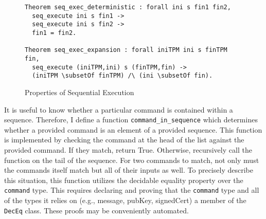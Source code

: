\begin{figure}[h]
\begin{lstlisting}[language=Coq]
Theorem seq_exec_deterministic : forall ini s fin1 fin2,
  seq_execute ini s fin1 ->
  seq_execute ini s fin2 ->
  fin1 = fin2.

Theorem seq_exec_expansion : forall iniTPM ini s finTPM fin,
  seq_execute (iniTPM,ini) s (finTPM,fin) ->
  (iniTPM \subsetOf finTPM) /\ (ini \subsetOf fin).
\end{lstlisting}
\caption{Properties of Sequential Execution}
\end{figure}

It is useful to know whether a particular command is contained within a sequence. Therefore, I define a function \verb|command_in_sequence| which determines whether a provided command is an element of a provided sequence. This function is implemented by checking the command at the head of the list against the provided command. If they match, return True. Otherwise, recursively call the function on the tail of the sequence.
For two commands to match, not only must the commands itself match but all of their inputs as well. To precisely describe this situation, this function utilizes the decidable equality property over the \verb|command| type. This requires declaring and proving that the \verb|command| type and all of the types it relies on (e.g., message, pubKey, signedCert) a member of the \verb|DecEq| class. These proofs may be conveniently automated.
